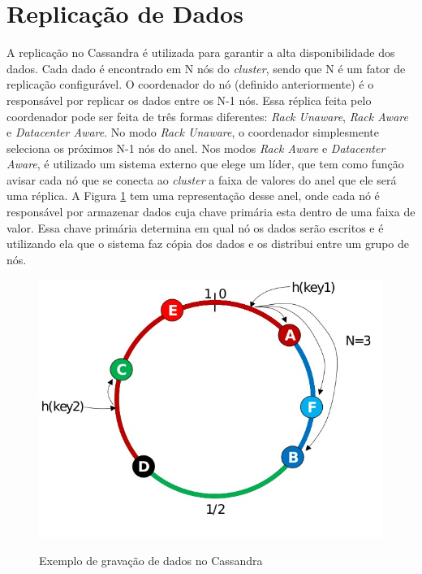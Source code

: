 \section{Replicação de Dados}
A replicação no Cassandra é utilizada para garantir a alta disponibilidade dos dados. Cada dado é encontrado em N nós do \textit{cluster}, sendo que N é um fator de replicação configurável. O coordenador do nó (definido anteriormente) é o responsável por replicar os dados entre os N-1 nós. Essa réplica feita pelo coordenador pode ser feita de três formas diferentes: \textit{Rack Unaware}, \textit{Rack Aware} e \textit{Datacenter Aware}. No modo \textit{Rack Unaware}, o coordenador simplesmente seleciona os próximos N-1 nós do anel. Nos modos \textit{Rack Aware} e \textit{Datacenter Aware}, é utilizado um sistema externo que elege um líder, que tem como função avisar cada nó que se conecta ao \textit{cluster} a faixa de valores do anel que ele será uma réplica. A Figura \ref{fig:gravacaoCassandra} tem uma representação desse anel, onde cada nó é responsável por armazenar dados cuja chave primária esta dentro de uma faixa de valor. Essa chave primária determina em qual nó os dados serão escritos e é utilizando ela que o sistema faz cópia dos dados e os distribui entre um grupo de nós. 

    \begin{figure}[htb]
    \centering
    \includegraphics[scale=0.5]{imagens/cassandra.png}
    \caption{Exemplo de gravação de dados no Cassandra} \cite[p. 3]{Silva}
    \label{fig:gravacaoCassandra}
    \end{figure}
    
